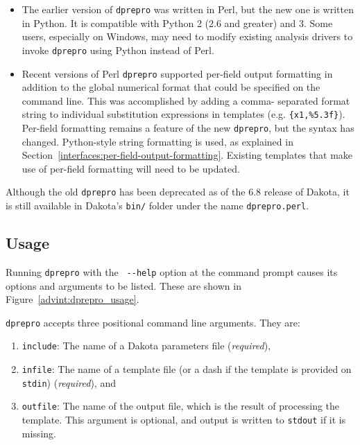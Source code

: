 {\begin{itemize}
 \item The earlier version of \texttt{dprepro} was written in Perl, but the 
	 new one is written in Python. It is compatible with Python 2 (2.6 and 
	 greater) and 3. Some users, especially on Windows, may need to modify 
	 existing analysis drivers to invoke \texttt{dprepro} using Python instead of
	 Perl.
 \item  Recent versions of Perl \texttt{dprepro} supported per-field output
	 formatting in addition to the global numerical format that could be 
	 specified on the command line. This was accomplished by adding a comma-
	 separated format string to individual substitution expressions in 
	 templates (e.g. \texttt{\{x1,\%5.3f\}}). Per-field formatting remains
	 a feature of the new \texttt{dprepro}, but the syntax has changed. 
	 Python-style string formatting is used, as explained in 
	 Section~\ref{interfaces:per-field-output-formatting}. Existing
	 templates that make use of per-field formatting will need to
	 be updated.
\end{itemize}
Although the old \texttt{dprepro} has been deprecated as of the 6.8 release 
of Dakota, it is still available in Dakota's \texttt{bin/} folder under the name 
\texttt{dprepro.perl}.

\subsection{Usage}\label{interfaces:dprepro-usage}

Running \texttt{dprepro} with the \texttt{ -\/-help} option at the command prompt 
causes its options and arguments to be listed. These are shown in 
Figure~\ref{advint:dprepro_usage}.

\texttt{dprepro} accepts three positional command line arguments. They are:

\begin{enumerate}
 \item \texttt{include}: The name of a Dakota parameters file (\emph{required}),
 \item \texttt{infile}: The name of a template file (or a dash if the template 
	 is provided on \texttt{stdin}) (\emph{required}), and 
 \item \texttt{outfile}: The name of the output file, which is the result of
         processing the template. This argument is optional, and output is 
	 written to \texttt{stdout} if it is missing.
\end{enumerate}

}
